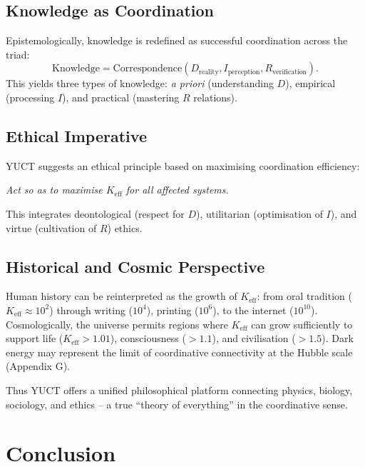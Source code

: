 \documentclass[11pt]{article}
\theoremstyle{remark}
\newcommand{\Keff}{K_{\mathrm{eff}}}
\begin{document}
	\subsection{Knowledge as Coordination}
	Epistemologically, knowledge is redefined as successful coordination across the triad:
	\begin{equation}
		\text{Knowledge} = \text{Correspondence}(D_{\text{reality}}, I_{\text{perception}}, R_{\text{verification}}).
	\end{equation}
	This yields three types of knowledge: \textit{a priori} (understanding $D$), empirical (processing $I$), and practical (mastering $R$ relations).
	
	\subsection{Ethical Imperative}
	YUCT suggests an ethical principle based on maximising coordination efficiency:
	\begin{center}
		\textit{Act so as to maximise $\Keff$ for all affected systems.}
	\end{center}
	This integrates deontological (respect for $D$), utilitarian (optimisation of $I$), and virtue (cultivation of $R$) ethics.
	
	\subsection{Historical and Cosmic Perspective}
	Human history can be reinterpreted as the growth of $\Keff$: from oral tradition ($\Keff \approx 10^2$) through writing ($10^4$), printing ($10^6$), to the internet ($10^{10}$). Cosmologically, the universe permits regions where $\Keff$ can grow sufficiently to support life ($\Keff > 1.01$), consciousness ($> 1.1$), and civilisation ($> 1.5$). Dark energy may represent the limit of coordinative connectivity at the Hubble scale (Appendix G).
	
	Thus YUCT offers a unified philosophical platform connecting physics, biology, sociology, and ethics – a true ``theory of everything'' in the coordinative sense.
	
	\section{Conclusion}
	\label{sec:conclusion}
	
\end{document}
